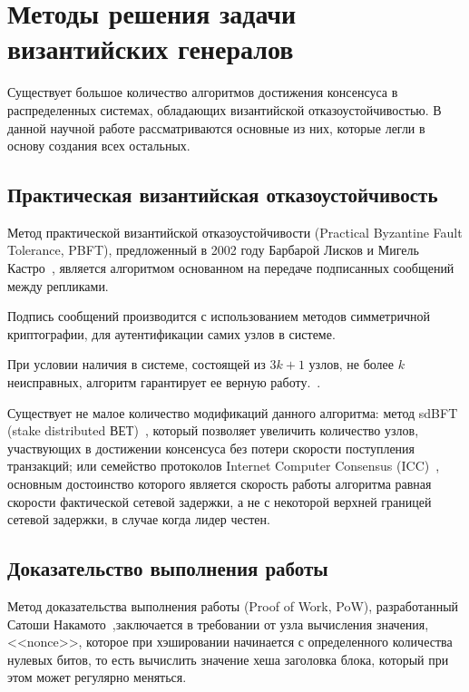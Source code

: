 \chapter{Методы решения задачи византийских генералов}


Существует большое количество алгоритмов достижения консенсуса в распределенных системах, обладающих византийской отказоустойчивостью. В данной научной работе рассматриваются основные из них, которые легли в основу создания всех остальных.


\section{Практическая византийская отказоустойчивость}

Метод практической византийской отказоустойчивости (Practical Byzantine Fault Tolerance, PBFT), предложенный в 2002 году Барбарой Лисков и Мигель Кастро~\cite{Castro2002}, является алгоритмом основанном на передаче подписанных сообщений между репликами. 

Подпись сообщений производится с использованием методов симметричной криптографии, для аутентификации самих узлов в системе.


При условии наличия в системе, состоящей из $3k + 1$ узлов, не более $k$ неисправных, алгоритм гарантирует ее верную работу.~\cite{Tanenbaum}. 


Существует не малое количество модификаций данного алгоритма: метод sdBFT (stake distributed ВЕТ)~\cite{algsBch}, который позволяет увеличить количество узлов, участвующих в достижении консенсуса без потери скорости поступления транзакций; или семейство протоколов Internet Computer Consensus (ICC)~\cite{icc}, основным достоинство которого является скорость работы алгоритма равная скорости фактической сетевой задержки, а не с некоторой верхней границей сетевой задержки, в случае когда лидер честен.


\section{Доказательство выполнения работы}

Метод доказательства выполнения работы (Proof of Work, PoW), разработанный Сатоши Накамото~\cite{Bitcoin},заключается в требовании от узла вычисления значения, <<nonce>>, которое при хэшировании начинается с определенного количества нулевых битов, то есть вычислить значение хеша заголовка блока, который при этом может регулярно меняться. 

